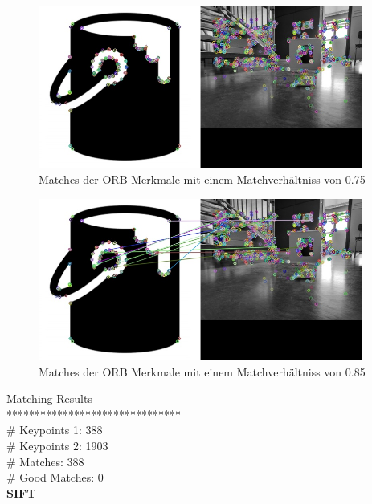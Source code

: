 \begin{figure}[H]
  \includegraphics[width=0.95\textwidth]{img/piktogrammerkennung/orb_matches.jpg}
  \centering
  \caption{Matches der ORB Merkmale mit einem Matchverhältniss von 0.75}
  \label{fig:orb-matches-0.75}
\end{figure}

\begin{figure}[H]
  \includegraphics[width=0.95\textwidth]{img/piktogrammerkennung/orb_matches_0.85.jpg}
  \centering
  \caption{Matches der ORB Merkmale mit einem Matchverhältniss von 0.85}
  \label{fig:orb-matches-0.85}
\end{figure}

Matching Results\\
*******************************\\
\# Keypoints 1:                           388\\
\# Keypoints 2:                           1903\\
\# Matches:                               388\\
\# Good Matches:                          0\\

\textbf{SIFT}\\

